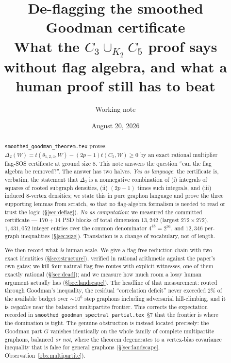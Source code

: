\documentclass[11pt]{article}
\title{De-flagging the smoothed Goodman certificate\\
\large What the $C_3\cup_{K_2}C_5$ proof says without flag algebra,
and what a human proof still has to beat}
\author{Working note}
\date{August 20, 2026}
\theoremstyle{definition}
\newcommand{\thet}{\theta_{1,2,4}}
\begin{document}
\maketitle

\begin{abstract}
\texttt{smoothed\_goodman\_theorem.tex} proves $\Delta_2(W)=t(\thet,W)-(2p-1)t(C_5,W)\ge0$
by an exact rational multiplier flag-SOS certificate at ground size $8$.  This note
answers the question ``can the flag algebra be removed?''.  The answer has two
halves.  \emph{Yes as language}: the certificate is, verbatim, the statement that
$\Delta_2$ is a nonnegative combination of (i) integrals of squares of rooted
subgraph densities, (ii) $(2p-1)$ times such integrals, and (iii) induced
$8$-vertex densities; we state this in pure graphon language and prove the three
supporting lemmas from scratch, so that no flag-algebra formalism is needed to
read or trust the logic (\S\ref{sec:deflag}).  \emph{No as computation}: we
measured the committed certificate --- $170+14$ PSD blocks of total dimension
$13{,}242$ (largest $272\times272$), $1{,}431{,}052$ integer entries over the
common denominator $4^{48}=2^{96}$, and $12{,}346$ per-graph inequalities
(\S\ref{sec:size}).  Translation is a change of vocabulary, not of length.

We then record what \emph{is} human-scale.  We give a flag-free reduction chain
with two exact identities (\S\ref{sec:structure}), verified in rational
arithmetic against the paper's own gates; we kill four natural flag-free routes
with explicit witnesses, one of them exactly rational (\S\ref{sec:dead}); and we
measure how much room a lossy human argument actually has
(\S\ref{sec:landscape}).  The headline of that measurement: routed through
Goodman's inequality, the residual ``correlation deficit'' never exceeded $2\%$
of the available budget over ${\sim}10^6$ step graphons including adversarial
hill-climbing, and it is \emph{negative} near the balanced multipartite
frontier.  This corrects the expectation recorded in
\texttt{smoothed\_goodman\_spectral\_partial.tex}~\S7 that the frontier is where
the domination is tight.  The genuine obstruction is instead located precisely:
the Goodman part $G$ vanishes identically on the whole family of complete
multipartite graphons, balanced \emph{or not}, where the theorem degenerates to
a vertex-bias covariance inequality that is false for general graphons
(\S\ref{sec:landscape}, Observation~\ref{obs:multipartite}).
\end{abstract}
\end{document}
